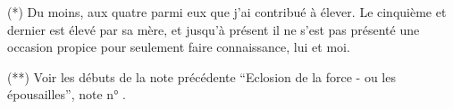 
(*) Du moins, aux quatre parmi eux que j'ai contribué à élever. Le cinquième et dernier est élevé par sa mère, et jusqu'à présent il ne s'est pas présenté une occasion propice pour seulement faire connaissance, lui et moi.

(**) Voir les débuts de la note précédente ``Eclosion de la force - ou les épousailles'', note n° .

